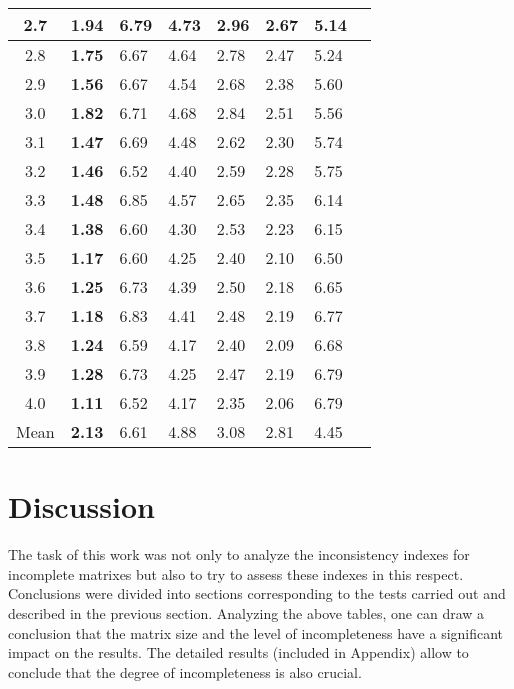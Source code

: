 \begin{table}[!ht]
\begin{center}
\begin{tabular}{|c||lllll||l|c|}
2.7 & \textbf{1.94} & 6.79 & 4.73 & 2.96 & 2.67 & 5.14 \\ \hline
2.8 & \textbf{1.75} & 6.67 & 4.64 & 2.78 & 2.47 & 5.24 \\ \hline
2.9 & \textbf{1.56} & 6.67 & 4.54 & 2.68 & 2.38 & 5.60 \\ \hline
3.0 & \textbf{1.82} & 6.71 & 4.68 & 2.84 & 2.51 & 5.56 \\ \hline
3.1 & \textbf{1.47} & 6.69 & 4.48 & 2.62 & 2.30 & 5.74 \\ \hline
3.2 & \textbf{1.46} & 6.52 & 4.40 & 2.59 & 2.28 & 5.75 \\ \hline
3.3 & \textbf{1.48} & 6.85 & 4.57 & 2.65 & 2.35 & 6.14 \\ \hline
3.4 & \textbf{1.38} & 6.60 & 4.30 & 2.53 & 2.23 & 6.15 \\ \hline
3.5 & \textbf{1.17} & 6.60 & 4.25 & 2.40 & 2.10 & 6.50 \\ \hline
3.6 & \textbf{1.25} & 6.73 & 4.39 & 2.50 & 2.18 & 6.65 \\ \hline
3.7 & \textbf{1.18} & 6.83 & 4.41 & 2.48 & 2.19 & 6.77 \\ \hline
3.8 & \textbf{1.24} & 6.59 & 4.17 & 2.40 & 2.09 & 6.68 \\ \hline
3.9 & \textbf{1.28} & 6.73 & 4.25 & 2.47 & 2.19 & 6.79 \\ \hline
4.0 & \textbf{1.11} & 6.52 & 4.17 & 2.35 & 2.06 & 6.79 \\ \hline \hline
Mean & \textbf{2.13} & 6.61 & 4.88 & 3.08 & 2.81 & 4.45 \\ \hline 
\end{tabular}
\end{center}
\end{table}


\section{Discussion}
The task of this work was not only to analyze the inconsistency indexes for incomplete matrixes but also to try to assess these indexes in this respect. Conclusions were divided into sections corresponding to the tests carried out and described in the previous section. Analyzing the above tables, one can draw a conclusion that the matrix size and the level of incompleteness have a significant impact on the results. The detailed results (included in Appendix) allow to conclude that the degree of incompleteness is also crucial.


